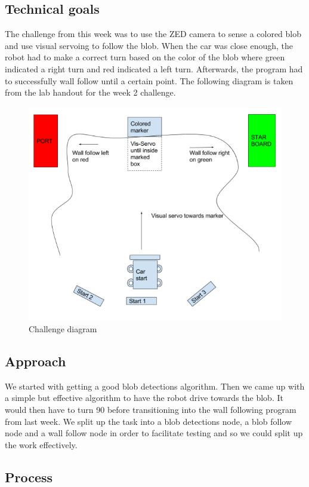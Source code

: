 \documentclass[journal, a4paper]{IEEEtran}
\begin{document}
\subsection{Technical goals}
The challenge from this week was to use the ZED camera to sense a colored blob and use visual servoing to follow the blob. When the car was close enough, the robot had to make a correct turn based on the color of the blob where green indicated a right turn and red indicated a left turn. Afterwards, the program had to successfully wall follow until a certain point. The following diagram is taken from the lab handout for the week 2 challenge. \\ 
\begin{figure}[H]
\includegraphics[scale=.42]{visual_servo.png}
\caption{Challenge diagram \cite{vs-handout}} 
\end{figure}
\subsection{Approach}
We started with getting a good blob detections algorithm. Then we came up with a simple but effective algorithm to have the robot drive towards the blob. It would then have to turn 90 \degree before transitioning into the wall following program from last week. We split up the task into a blob detections node, a blob follow node and a wall follow node in order to facilitate testing and so we could split up the work effectively. 
\subsection{Process}
\end{document}
